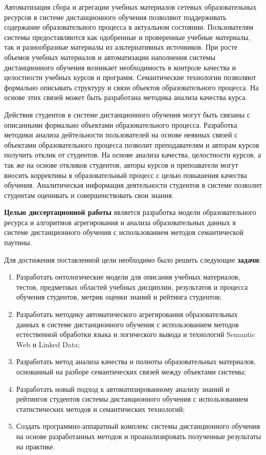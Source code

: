 Автоматизация сбора и агрегации учебных материалов сетевых образовательных ресурсов в системе дистанционного обучения позволяют поддерживать содержание образовательного процесса в актуальном состоянии. Пользователям системы предоставляются как одобренные и проверенные учебные материалы, так и разнообразные материалы из альтернативных источников. При росте объемов учебных материалов и автоматизации наполнения системы дистанционного обучения возникает необходимость в контроле качества и целостности учебных курсов и программ. Семантические технологии позволяют формально описывать структуру и связи объектов образовательного процесса. На основе этих связей может быть разработана методика анализа качества курса. 

Действия студентов в системе дистанционного обучения могут быть связаны с описанными формально объектами образовательного процесса. Разработка методики анализа дейтельности пользователей на основе неявных связей с объектами образовательного процесса позволит преподавателям и авторам курсов получить отклик от студентов. На основе анализа качества, целостности курсов, а так же на основе откликов студентов, авторы курсов и препоаватели могут вносить коррективы в образовательный процесс с целью повышения качества обучения. Аналитическая информация деятельности студентов в системе позволит студентам оценивать и совершенствовать свои знания.     

\textbf{Целью диссертационной работы} является разработка модели образовательного ресурса и алгоритмов агрегирования и анализа образовательных данных в системе дистанционного обучения с использованием методов семантической паутины. 

Для достижения поставленной цели необходимо было решить следующие \textbf{задачи}:
\begin{enumerate}
 \item Разработать онтологические модели для описания учебных материалов, тестов, предметных областей учебных дисциплин, результатов и процесса обучения студентов, метрик оценки знаний и рейтинга студентов;
 \item Разработать методику автоматического агрегирования образовательных данных в системе дистанционного обучения с использованием методов естественной обработки языка и логического вывода и технологий Semantic Web и Linked Data;
 \item Разработать метод анализа качества и полноты образовательных материалов, основанный на разборе семантических связей между объектами системы;
  \item Разработать новый подход к автоматизированному анализу знаний и рейтингов студентов системы дистанционного обучения с использованием статистических методов и семантических технологий;
  \item Создать программно-аппаратный комплекс системы дистанционного обучения на основе разработанных методов и проанализировать полученные результаты на практике.  
 \end{enumerate}

